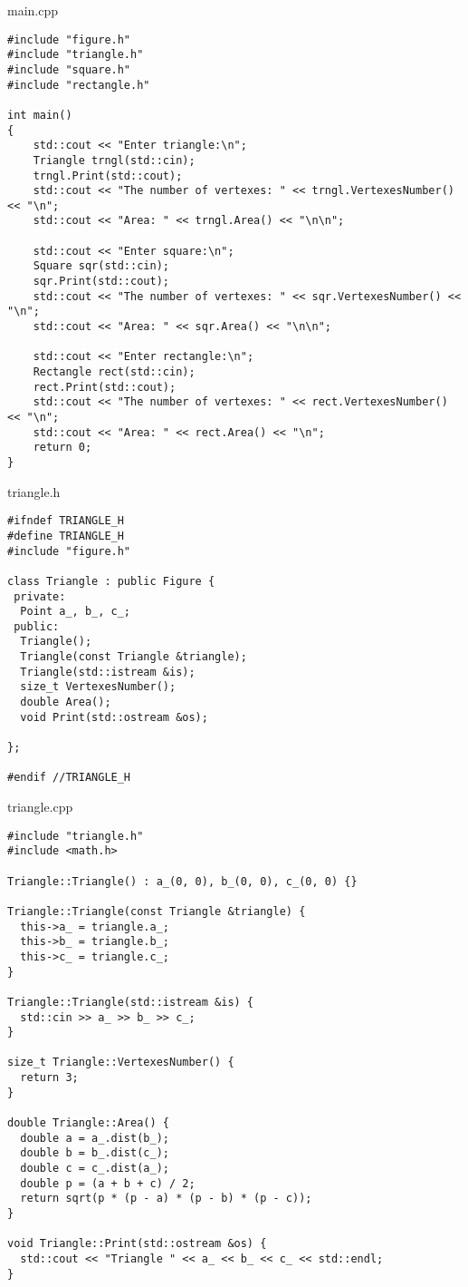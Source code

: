 \documentclass[12pt]{article}
\begin{document}
\begin{flushleft}
{\Huge main.cpp}
\begin{verbatim}
#include "figure.h"
#include "triangle.h"
#include "square.h"
#include "rectangle.h"

int main()
{
    std::cout << "Enter triangle:\n";
    Triangle trngl(std::cin);
    trngl.Print(std::cout);
    std::cout << "The number of vertexes: " << trngl.VertexesNumber() << "\n";
    std::cout << "Area: " << trngl.Area() << "\n\n";

    std::cout << "Enter square:\n";
    Square sqr(std::cin);
    sqr.Print(std::cout);
    std::cout << "The number of vertexes: " << sqr.VertexesNumber() << "\n";
    std::cout << "Area: " << sqr.Area() << "\n\n";

    std::cout << "Enter rectangle:\n";
    Rectangle rect(std::cin);
    rect.Print(std::cout);
    std::cout << "The number of vertexes: " << rect.VertexesNumber() << "\n";
    std::cout << "Area: " << rect.Area() << "\n";
    return 0;
}
\end{verbatim}
\end{flushleft}
    \pagebreak

\begin{flushleft}
{\Huge triangle.h}
\begin{verbatim}
#ifndef TRIANGLE_H
#define TRIANGLE_H
#include "figure.h"

class Triangle : public Figure {
 private:
  Point a_, b_, c_;
 public:
  Triangle();
  Triangle(const Triangle &triangle);
  Triangle(std::istream &is);
  size_t VertexesNumber();
  double Area();
  void Print(std::ostream &os);

};

#endif //TRIANGLE_H
\end{verbatim}
\end{flushleft}
    \pagebreak

\begin{flushleft}
{\Huge triangle.cpp}
\begin{verbatim}
#include "triangle.h"
#include <math.h>

Triangle::Triangle() : a_(0, 0), b_(0, 0), c_(0, 0) {}

Triangle::Triangle(const Triangle &triangle) {
  this->a_ = triangle.a_;
  this->b_ = triangle.b_;
  this->c_ = triangle.c_;
}

Triangle::Triangle(std::istream &is) {
  std::cin >> a_ >> b_ >> c_;
}

size_t Triangle::VertexesNumber() {
  return 3;
}

double Triangle::Area() {
  double a = a_.dist(b_);
  double b = b_.dist(c_);
  double c = c_.dist(a_);
  double p = (a + b + c) / 2;
  return sqrt(p * (p - a) * (p - b) * (p - c));
}

void Triangle::Print(std::ostream &os) {
  std::cout << "Triangle " << a_ << b_ << c_ << std::endl;
}
\end{verbatim}
\end{flushleft}
    \pagebreak
\end{document}
